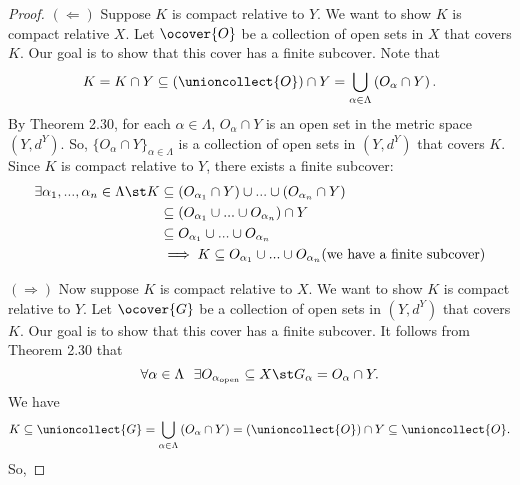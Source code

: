 \documentclass[a4paper]{article}
\begin{document}
	\begin{proof}
		$(\Leftarrow)$ Suppose $K$ is compact relative to $Y$. We want to show $K$ is compact relative $X$. Let $\ocover{O}$ be a collection of open sets in $X$ that covers $K$. Our goal is to show that this cover has a finite subcover. Note that
		$$K=K\cap Y \subseteq \left( \unioncollect{O} \right)\cap Y = \bigcup \limits_{\alpha \in \Lambda} \left(O_\alpha \cap Y \right).$$
		By Theorem 2.30, for each $\alpha \in \Lambda$, $O_\alpha \cap Y$ is an open set in the metric space $(Y,d^Y).$ So, $\{O_\alpha \cap Y\}_{\alpha \in \Lambda}$ is a collection of open sets in $(Y,d^Y)$ that covers $K$. Since $K$ is compact relative to $Y$, there exists a finite subcover:
		\begin{align*}
			\exists \alpha_1,...,\alpha_n \in \Lambda \st K &\subseteq (O_{\alpha_1}\cap Y)\cup...\cup(O_{\alpha_n}\cap Y) \\
			&\subseteq(O_{\alpha_1}\cup ... \cup O_{\alpha_n})\cap Y \\
			&\subseteq O_{\alpha_1}\cup ... \cup O_{\alpha_n}\\
			&\implies K \subseteq O_{\alpha_1}\cup ... \cup O_{\alpha_n} \text{(we have a finite subcover)}
		\end{align*}
		
		$(\Rightarrow)$ Now suppose $K$ is compact relative to $X$. We want to show $K$ is compact relative to $Y$. Let $\ocover{G}$ be a collection of open sets in $(Y, d^Y)$ that covers $K$. Our goal is to show that this cover has a finite subcover. It follows from Theorem 2.30 that
		$$\forall \alpha \in \Lambda ~~ \exists O_{\alpha_{\text{open}}} \subseteq X \st G_\alpha = O_\alpha \cap Y.$$
		We have
		$$K \subseteq \unioncollect{G} = \bigcup \limits_{\alpha \in \Lambda} \left(O_\alpha \cap Y\right) = \left(\unioncollect{O}\right) \cap Y \subseteq \unioncollect{O}.$$
		So, 
	\end{proof}
	
\end{document}
